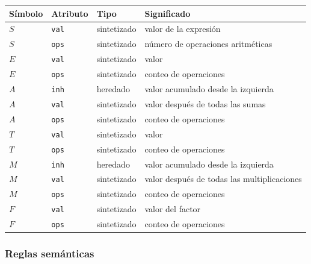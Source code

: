 \documentclass[11pt,a4paper]{article}
\begin{document}
\begin{center}
\begin{tabular}{@{}llll@{}}
\toprule
\textbf{S\'imbolo} & \textbf{Atributo} & \textbf{Tipo} & \textbf{Significado} \\
\midrule
$S$ & \texttt{val} & sintetizado & valor de la expresi\'on \\
$S$ & \texttt{ops} & sintetizado & n\'umero de operaciones aritm\'eticas \\
$E$ & \texttt{val} & sintetizado & valor \\
$E$ & \texttt{ops} & sintetizado & conteo de operaciones \\
$A$ & \texttt{inh} & heredado    & valor acumulado desde la izquierda \\
$A$ & \texttt{val} & sintetizado & valor despu\'es de todas las sumas \\
$A$ & \texttt{ops} & sintetizado & conteo de operaciones \\
$T$ & \texttt{val} & sintetizado & valor \\
$T$ & \texttt{ops} & sintetizado & conteo de operaciones \\
$M$ & \texttt{inh} & heredado    & valor acumulado desde la izquierda \\
$M$ & \texttt{val} & sintetizado & valor despu\'es de todas las multiplicaciones \\
$M$ & \texttt{ops} & sintetizado & conteo de operaciones \\
$F$ & \texttt{val} & sintetizado & valor del factor \\
$F$ & \texttt{ops} & sintetizado & conteo de operaciones \\
\bottomrule
\end{tabular}
\end{center}

\subsubsection*{Reglas sem\'anticas}
\end{document}
